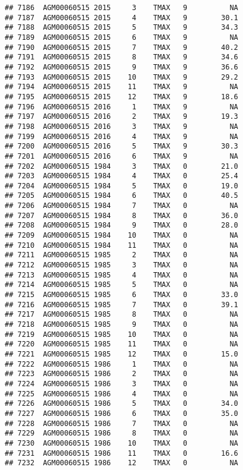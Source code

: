 \documentclass{article}\usepackage[]{graphicx}\usepackage[]{color}
\makeatletter
\newenvironment{kframe}{%
 \def\at@end@of@kframe{}%
 \ifinner\ifhmode%
  \def\at@end@of@kframe{\end{minipage}}%
  \begin{minipage}{\columnwidth}%
 \fi\fi%
 \def\FrameCommand##1{\hskip\@totalleftmargin \hskip-\fboxsep
 \colorbox{shadecolor}{##1}\hskip-\fboxsep
     \hskip-\linewidth \hskip-\@totalleftmargin \hskip\columnwidth}%
 \MakeFramed {\advance\hsize-\width
   \@totalleftmargin\z@ \linewidth\hsize
   \@setminipage}}%
 {\par\unskip\endMakeFramed%
 \at@end@of@kframe}
\newenvironment{knitrout}{}{} %
\makeatother
\begin{document}
\begin{knitrout}
\begin{kframe}
\begin{verbatim}
## 7186  AGM00060515 2015     3    TMAX   9          NA
## 7187  AGM00060515 2015     4    TMAX   9        30.1
## 7188  AGM00060515 2015     5    TMAX   9        34.3
## 7189  AGM00060515 2015     6    TMAX   9          NA
## 7190  AGM00060515 2015     7    TMAX   9        40.2
## 7191  AGM00060515 2015     8    TMAX   9        34.6
## 7192  AGM00060515 2015     9    TMAX   9        36.6
## 7193  AGM00060515 2015    10    TMAX   9        29.2
## 7194  AGM00060515 2015    11    TMAX   9          NA
## 7195  AGM00060515 2015    12    TMAX   9        18.6
## 7196  AGM00060515 2016     1    TMAX   9          NA
## 7197  AGM00060515 2016     2    TMAX   9        19.3
## 7198  AGM00060515 2016     3    TMAX   9          NA
## 7199  AGM00060515 2016     4    TMAX   9          NA
## 7200  AGM00060515 2016     5    TMAX   9        30.3
## 7201  AGM00060515 2016     6    TMAX   9          NA
## 7202  AGM00060515 1984     3    TMAX   0        21.0
## 7203  AGM00060515 1984     4    TMAX   0        25.4
## 7204  AGM00060515 1984     5    TMAX   0        19.0
## 7205  AGM00060515 1984     6    TMAX   0        40.5
## 7206  AGM00060515 1984     7    TMAX   0          NA
## 7207  AGM00060515 1984     8    TMAX   0        36.0
## 7208  AGM00060515 1984     9    TMAX   0        28.0
## 7209  AGM00060515 1984    10    TMAX   0          NA
## 7210  AGM00060515 1984    11    TMAX   0          NA
## 7211  AGM00060515 1985     2    TMAX   0          NA
## 7212  AGM00060515 1985     3    TMAX   0          NA
## 7213  AGM00060515 1985     4    TMAX   0          NA
## 7214  AGM00060515 1985     5    TMAX   0          NA
## 7215  AGM00060515 1985     6    TMAX   0        33.0
## 7216  AGM00060515 1985     7    TMAX   0        39.1
## 7217  AGM00060515 1985     8    TMAX   0          NA
## 7218  AGM00060515 1985     9    TMAX   0          NA
## 7219  AGM00060515 1985    10    TMAX   0          NA
## 7220  AGM00060515 1985    11    TMAX   0          NA
## 7221  AGM00060515 1985    12    TMAX   0        15.0
## 7222  AGM00060515 1986     1    TMAX   0          NA
## 7223  AGM00060515 1986     2    TMAX   0          NA
## 7224  AGM00060515 1986     3    TMAX   0          NA
## 7225  AGM00060515 1986     4    TMAX   0          NA
## 7226  AGM00060515 1986     5    TMAX   0        34.0
## 7227  AGM00060515 1986     6    TMAX   0        35.0
## 7228  AGM00060515 1986     7    TMAX   0          NA
## 7229  AGM00060515 1986     8    TMAX   0          NA
## 7230  AGM00060515 1986    10    TMAX   0          NA
## 7231  AGM00060515 1986    11    TMAX   0        16.6
## 7232  AGM00060515 1986    12    TMAX   0          NA

\end{verbatim}
\end{kframe}
\end{knitrout}
\end{document}
